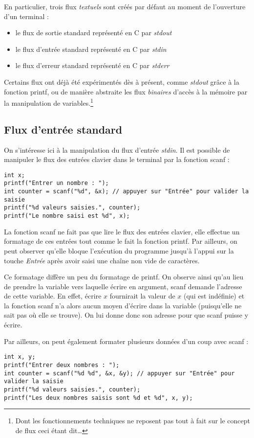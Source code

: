 \documentclass[../../../main.tex]{subfiles}
\begin{document}
En particulier, trois flux \textit{textuels} sont créés par défaut au moment de l'ouverture d'un terminal :
\begin{itemize}
	\item le flux de sortie standard représenté en C par \textit{stdout}
	\item le flux d'entrée standard représenté en C par \textit{stdin}
	\item le flux d'erreur standard représenté en C par \textit{stderr}
\end{itemize}
Certains flux ont déjà été expérimentés dès à présent, comme \textit{stdout} grâce à la fonction \textsf{printf}, ou de manière abstraite les flux \textit{binaires} d'accès à la mémoire par la manipulation de variables.\footnote{Dont les fonctionnements techniques ne reposent pas tout à fait sur le concept de flux ceci étant dit\dots }
 
\subsection{Flux d'entrée standard}
On s'intéresse ici à la manipulation du flux d'entrée \textit{stdin}. Il est possible de manipuler le flux des entrées clavier dans le terminal par la fonction \textsf{scanf} :
\begin{verbatim}
int x;
printf("Entrer un nombre : ");
int counter = scanf("%d", &x); // appuyer sur "Entrée" pour valider la saisie
printf("%d valeurs saisies.", counter);
printf("Le nombre saisi est %d", x);
\end{verbatim}
La fonction \textsf{scanf} ne fait pas que lire le flux des entrées clavier, elle effectue un formatage de ces entrées tout comme le fait la fonction \textsf{printf}. Par ailleurs, on peut observer qu'elle bloque l'exécution du programme jusqu'à l'appui sur la touche \textit{Entrée} après avoir saisi une chaîne non vide de caractères.
 
Ce formatage diffère un peu du formatage de \textsf{printf}. On observe ainsi qu'au lieu de prendre la variable vers laquelle écrire en argument, \textsf{scanf} demande l'adresse de cette variable. En effet, écrire $x$ fournirait la valeur de $x$ (qui est indéfinie) et la fonction \textsf{scanf} n'a alors aucun moyen d'écrire dans la variable (puisqu'elle ne sait pas où elle se trouve). On lui donne donc son adresse pour que \textsf{scanf} puisse y écrire.
 
Par ailleurs, on peut également formater plusieurs données d'un coup avec \textsf{scanf} :
\begin{listing}[ht]
	\begin{verbatim}
int x, y;
printf("Entrer deux nombres : ");
int counter = scanf("%d %d", &x, &y); // appuyer sur "Entrée" pour valider la saisie
printf("%d valeurs saisies.", counter);
printf("Les deux nombres saisis sont %d et %d", x, y);
	\end{verbatim}
	\label{lst:prgm1}
\end{listing}
\end{document}
